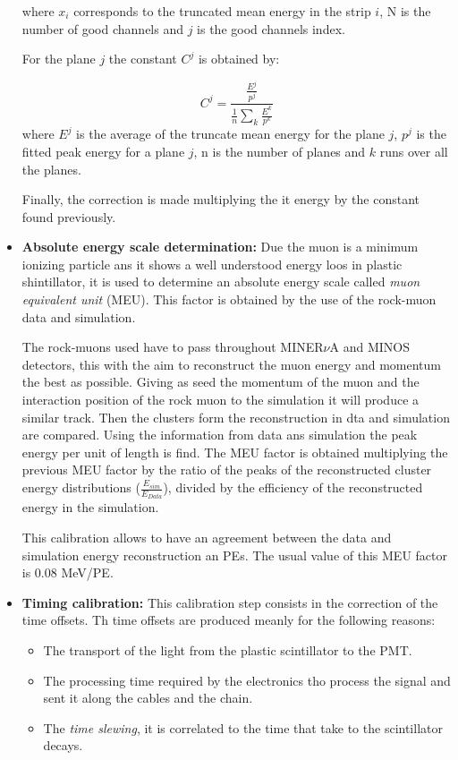 \begin{itemize}
    where $x_i$ corresponds to the truncated mean energy in the strip $i$, N is the number of good channels and $j$ is the good channels index. 

    For the plane $j$ the constant $C^j$ \cite{MINERvA} is obtained by:

    \begin{equation}
        C^j = \frac{\frac{E^j}{p^j}}{\frac{1}{n}\sum_k\frac{E^k}{p^k}}
        \label{eq:MnvExp:MnvDetector:Calibration:InSitu:ResponsPlaneConstant}
    \end{equation}
    where $E^j$ is the average of the truncate mean energy for the plane $j$, $p^j$ is the fitted peak energy for a plane $j$, n is the number of planes and $k$ runs over all the planes.   
    
    Finally, the correction is made multiplying the it energy by the constant found previously.   
    \item \textbf{Absolute energy scale determination:} Due the muon is a minimum ionizing particle ans it shows a well understood energy loos in plastic shintillator, it is used to determine an absolute energy scale called \textit{muon equivalent unit} (MEU). This factor is obtained by the use of the rock-muon data and simulation. 

    The rock-muons used have to pass throughout MINER$\nu$A and MINOS detectors, this with the aim to reconstruct the muon energy and momentum the best as possible. Giving as seed the momentum of the muon and the interaction position of the rock muon to the simulation it will produce a similar track. Then the clusters form the reconstruction in dta and simulation are compared. Using the information from data ans simulation the peak energy per unit of length is find. The MEU factor is obtained multiplying the previous MEU factor by the ratio of the peaks of the reconstructed cluster energy distributions ($\frac{E_{sim}}{E_{Data}}$), divided by the efficiency of the reconstructed energy in the simulation.

    This calibration allows to have an agreement between the data and simulation energy reconstruction an PEs. The usual value of this MEU factor is 0.08 MeV/PE.
    \item \textbf{Timing calibration:} This calibration step consists in the correction of the time offsets. Th time offsets are produced meanly for the following reasons:
    \begin{itemize}
        \item The transport of the light from the plastic scintillator to the PMT.
        \item The processing time required by the electronics tho process the signal and sent it along the cables and the chain.  
        \item The \textit{time slewing}, it is correlated to the time that take to the scintillator decays.
    \end{itemize}


\end{itemize}
